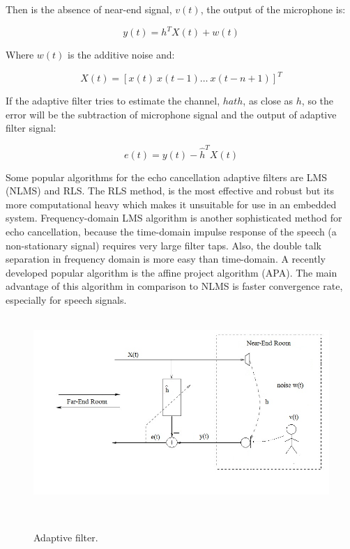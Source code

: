 \documentclass[a4paper,11pt,twoside]{article}
\begin{document}
Then is the absence of near-end signal, $v(t)$, the output of the microphone is:

\begin{equation}
\ y(t) = h^T X(t) + w(t)\ 	
\end{equation}

Where $w(t)$ is the additive noise and:

 \begin{equation}
X(t) = [ x(t) \ x(t-1) \dots \ x(t-n+1) ]^T  
\end{equation}

If the adaptive filter tries to estimate the channel, $hat{h}$, as close as $h$, so the error will be the subtraction of microphone signal and the output of adaptive filter signal\cite{1}:

\begin{equation}
e(t) = y(t) - {\hat{h}}^{T} X(t)
\end{equation}

Some popular algorithms for the echo cancellation adaptive filters are LMS (NLMS) and RLS. The RLS method, is the most effective and robust but its more computational heavy which makes it unsuitable for use in an embedded system\cite{2}. Frequency-domain LMS algorithm is another sophisticated method for echo cancellation, because the time-domain impulse response of the speech (a non-stationary signal) requires very large filter taps. Also, the double talk separation in frequency domain\cite{3} is more easy than time-domain. A recently developed popular algorithm is the affine project algorithm (APA). The main advantage of this algorithm in comparison to NLMS is faster convergence rate, especially for speech signals\cite{4}.

\begin{figure} \
  \centering
	\includegraphics[width=1\textwidth]{Adaptive_Filter.jpg}
  	\caption{Adaptive filter\cite{1}.}
  	\label{fig:adaptive}
\ \end{figure}
\end{document}
